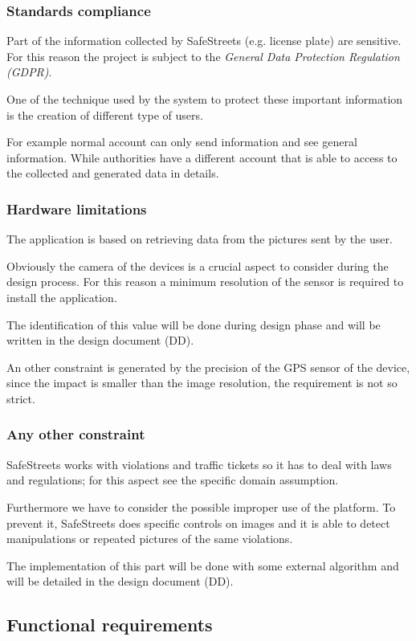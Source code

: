 \subsubsection{Standards compliance}
Part of the information collected by SafeStreets (e.g. license plate) are sensitive. For this reason the project is subject to the \textit{General Data Protection Regulation (GDPR)}. 

One of the technique used by the system to protect these important information is the creation of different type of users. 

For example normal account can only send information and see general information.
While authorities have a different account that is able to access to the collected and generated data in details.

\subsubsection{Hardware limitations}
The application is based on retrieving data from the pictures sent by the user. 

Obviously the camera of the devices is a crucial aspect to consider during the design process. For this reason a minimum resolution of the sensor is required to install the application.

The identification of this value will be done during design phase and will be written in the design document (DD).

An other constraint is generated by the precision of the GPS sensor of the device, since the impact is smaller than the image resolution, the requirement is not so strict. 

\subsubsection{Any other constraint}
SafeStreets works with violations and traffic tickets so it has to deal with laws and regulations; for this aspect see the specific domain assumption.

Furthermore we have to consider the possible improper use of the platform. To prevent it, SafeStreets does specific controls on images and it is able to detect manipulations or repeated pictures of the same violations. 

The implementation of this part will be done with some external algorithm and will be detailed in the design document (DD).
\newpage
\subsection{Functional requirements}
